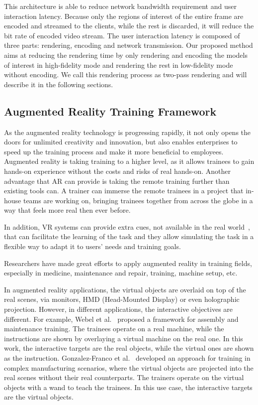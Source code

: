 This architecture is able to reduce network bandwidth requirement and user interaction latency.
Because only the regions of interest of the entire frame are encoded and streamed to the clients, while the rest is discarded, it will reduce the bit rate of encoded video stream.
The user interaction latency is composed of three parts: rendering, encoding and network transmission. Our proposed method aims at reducing the rendering time by only rendering and encoding the models of interest in high-fidelity mode and rendering the rest in low-fidelity mode without encoding. We call this rendering process as two-pass rendering and will describe it in the following sections.

\subsection{Augmented Reality Training Framework}

As the augmented reality technology is progressing rapidly, it not only opens the doors for unlimited creativity and innovation, but also enables enterprises to speed up the training process and make it more beneficial to employees.
Augmented reality is taking training to a higher level, as it allows trainees to gain hands-on experience without the costs and risks of real hands-on. Another advantage that AR can provide is taking the remote training further than existing tools can. A trainer can immerse the remote trainees in a project that in-house teams are working on, bringing trainees together from across the globe in a way that feels more real then ever before.

In addition, VR systems can provide extra cues, not available in the real world~\cite{gosselin2010}, that can facilitate the learning of the task and they allow simulating the task in a flexible way to adapt it to users' needs and training goals.

Researchers have made great efforts to apply augmented reality in training fields, especially in medicine, maintenance and repair, training, machine setup, etc.

In augmented reality applications, the virtual objects are overlaid on top of the real scenes, via monitors, HMD (Head-Mounted Display) or even holographic projection. However, in different applications, the interactive objectives are different. For example, Webel et al.~\cite{webel2011} proposed a framework for assembly and maintenance training. The trainees operate on a real machine, while the instructions are shown by overlaying a virtual machine on the real one. In this work, the interactive targets are the real objects, while the virtual ones are shown as the instruction. Gonzalez-Franco et al.~\cite{gonzalez-franco2016} developed an approach for training in complex manufacturing scenarios, where the virtual objects are projected into the real scenes without their real counterparts. The trainers operate on the virtual objects with a wand to teach the trainees. In this use case, the interactive targets are the virtual objects.

